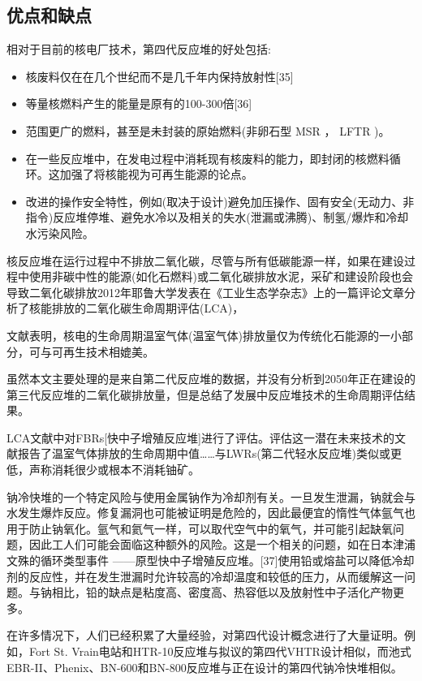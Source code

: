 \subsection{优点和缺点}
相对于目前的核电厂技术，第四代反应堆的好处包括:
\begin{itemize}
\item 核废料仅在在几个世纪而不是几千年内保持放射性[35]
\item 等量核燃料产生的能量是原有的100-300倍[36]
\item 范围更广的燃料，甚至是未封装的原始燃料(非卵石型 MSR ， LFTR )。
\item 在一些反应堆中，在发电过程中消耗现有核废料的能力，即封闭的核燃料循环。这加强了将核能视为可再生能源的论点。
\item 改进的操作安全特性，例如(取决于设计)避免加压操作、固有安全(无动力、非指令)反应堆停堆、避免水冷以及相关的失水(泄漏或沸腾)、制氢/爆炸和冷却水污染风险。
\end{itemize}
核反应堆在运行过程中不排放二氧化碳，尽管与所有低碳能源一样，如果在建设过程中使用非碳中性的能源(如化石燃料)或二氧化碳排放水泥，采矿和建设阶段也会导致二氧化碳排放2012年耶鲁大学发表在《工业生态学杂志》上的一篇评论文章分析了核能排放的二氧化碳生命周期评估(LCA)，

文献表明，核电的生命周期温室气体(温室气体)排放量仅为传统化石能源的一小部分，可与可再生技术相媲美。

虽然本文主要处理的是来自第二代反应堆的数据，并没有分析到2050年正在建设的第三代反应堆的二氧化碳排放量，但是总结了发展中反应堆技术的生命周期评估结果。

LCA文献中对FBRs[快中子增殖反应堆]进行了评估。评估这一潜在未来技术的文献报告了温室气体排放的生命周期中值……与LWRs(第二代轻水反应堆)类似或更低，声称消耗很少或根本不消耗铀矿。

钠冷快堆的一个特定风险与使用金属钠作为冷却剂有关。一旦发生泄漏，钠就会与水发生爆炸反应。修复漏洞也可能被证明是危险的，因此最便宜的惰性气体氩气也用于防止钠氧化。氩气和氦气一样，可以取代空气中的氧气，并可能引起缺氧问题，因此工人们可能会面临这种额外的风险。这是一个相关的问题，如在日本津浦文殊的循环类型事件 ——原型快中子增殖反应堆。[37]使用铅或熔盐可以降低冷却剂的反应性，并在发生泄漏时允许较高的冷却温度和较低的压力，从而缓解这一问题。与钠相比，铅的缺点是粘度高、密度高、热容低以及放射性中子活化产物更多。

在许多情况下，人们已经积累了大量经验，对第四代设计概念进行了大量证明。例如，Fort St. Vrain电站和HTR-10反应堆与拟议的第四代VHTR设计相似，而池式EBR-II、Phenix、BN-600和BN-800反应堆与正在设计的第四代钠冷快堆相似。

